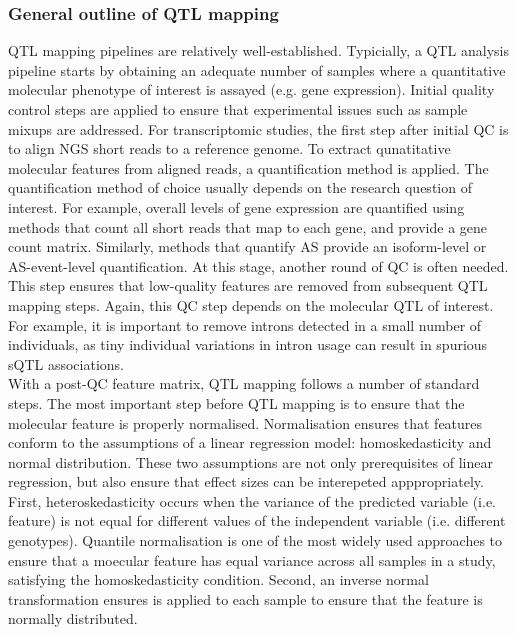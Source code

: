 \subsubsection{General outline of QTL mapping}
QTL mapping pipelines are relatively well-established. Typicially, a QTL analysis pipeline starts by obtaining an adequate number of samples where a quantitative molecular phenotype of interest is assayed (e.g. gene expression). Initial quality control steps are applied to ensure that experimental issues such as sample mixups are addressed. For transcriptomic studies, the first step after initial QC is to align NGS short reads to a reference genome. To extract qunatitative molecular features from aligned reads, a quantification method is applied. The quantification method of choice usually depends on the research question of interest. For example, overall levels of gene expression are quantified using methods that count all short reads that map to each gene, and provide a gene count matrix. Similarly, methods that quantify AS provide an isoform-level or AS-event-level quantification. At this stage, another round of QC is often needed. This step ensures that low-quality features are removed from subsequent QTL mapping steps. Again, this QC step depends on the molecular QTL of interest. For example, it is important to remove introns detected in a small number of individuals, as tiny individual variations in intron usage can result in spurious sQTL associations. \\

With a post-QC feature matrix, QTL mapping follows a number of standard steps. The most important step before QTL mapping is to ensure that the molecular feature is properly normalised. Normalisation ensures that features conform to the assumptions of a linear regression model: homoskedasticity and normal distribution. These two assumptions are not only prerequisites of linear regression, but also ensure that effect sizes can be interepeted apppropriately. First, heteroskedasticity occurs when the variance of the predicted variable (i.e. feature) is not equal for different values of the independent variable (i.e. different genotypes). Quantile normalisation is one of the most widely used approaches to ensure that a moecular feature has equal variance across all samples in a study, satisfying the homoskedasticity condition. Second, an inverse normal transformation ensures is applied to each sample to ensure that the feature is normally distributed.\\ 

